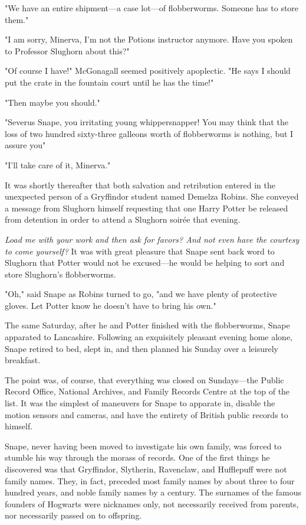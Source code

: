 "We have an entire shipment—a case lot—of flobberworms. Someone has to store them."

"I am sorry, Minerva, I'm not the Potions instructor anymore. Have you spoken to Professor Slughorn about this?"

"Of course I have!" McGonagall seemed positively apoplectic. "He says I should put the crate in the fountain court until he has the time!"

"Then maybe you should."

"Severus Snape, you irritating young whippersnapper! You may think that the loss of two hundred sixty-three galleons worth of flobberworms is nothing, but I assure you{\el}"

"I'll take care of it, Minerva."

It was shortly thereafter that both salvation and retribution entered in the unexpected person of a Gryffindor student named Demelza Robins. She conveyed a message from Slughorn himself requesting that one Harry Potter be released from detention in order to attend a Slughorn soirée that evening.

\emph{Load me with your work and then ask for favors? And not even have the courtesy to come yourself?} It was with great pleasure that Snape sent back word to Slughorn that Potter would not be excused—he would be helping to sort and store Slughorn's flobberworms.

"Oh," said Snape as Robins turned to go, "and we have plenty of protective gloves. Let Potter know he doesn't have to bring his own."

The same Saturday, after he and Potter finished with the flobberworms, Snape apparated to Lancashire. Following an exquisitely pleasant evening home alone, Snape retired to bed, slept in, and then planned his Sunday over a leisurely breakfast.

The point was, of course, that everything was closed on Sundays—the Public Record Office, National Archives, and Family Records Centre at the top of the list. It was the simplest of maneuvers for Snape to apparate in, disable the motion sensors and cameras, and have the entirety of British public records to himself.

Snape, never having been moved to investigate his own family, was forced to stumble his way through the morass of records. One of the first things he discovered was that Gryffindor, Slytherin, Ravenclaw, and Hufflepuff were not family names. They, in fact, preceded most family names by about three to four hundred years, and noble family names by a century. The surnames of the famous founders of Hogwarts were nicknames only, not necessarily received from parents, nor necessarily passed on to offspring.

